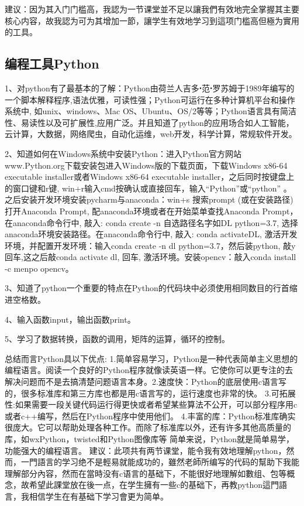 \documentclass[supercite]{Experimental_Report}
\theoremstyle{definition}
\begin{document}
	建议：因为其入门门槛高，我認为一节课堂並不足以讓我們有效地完全掌握其主要核心内容，故我認为可为其增加一節，讓学生有效地学习到這项门槛高但極为實用的工具。
	\newpage
	\subsection{编程工具Python}
	
	1、对python有了最基本的了解：Python由荷兰人吉多ꞏ范ꞏ罗苏姆于1989年编写的一个脚本解释程序,语法优雅，可读性强；Python可运行在多种计算机平台和操作系统中, 如unix、windows、Mac OS、Ubuntu、OS/2等等；Python语言具有简洁性、易读性以及可扩展性,应用广泛。并且知道了python的应用场合如人工智能，云计算，大数据，网络爬虫，自动化运维，web开发，科学计算，常规软件开发。
	
	2、知道如何在Windows系统中安装Python：进入Python官方网站www.Python.org下载安装包进入Windows版的下载页面，下载Windows x86-64 executable installer或者Windows x86-64 executable installer，之后同时按键盘上的窗口键和r键, win+r输入cmd按确认或直接回车，输入“Python”或“python” 。之后安装开发环境安装pycharm与anaconda：win+s 搜索prompt (或在安装路径) 打开Anaconda Prompt, 配anaconda环境或者在开始菜单查找Anaconda Prompt，在anaconda命令行中, 敲入: conda create -n 自选路径名字如DL python=3.7, 选择anaconda环境安装路径。在anaconda命令行中, 敲入: conda activateDL, 激活开发环境，并配置开发环境：输入conda create -n dl python=3.7，然后装python, 敲y回车,这之后敲conda activate dl, 回车, 激活环境。安装opencv：敲入conda install -c menpo opencv。
	
	3、知道了python一个重要的特点在Python的代码块中必须使用相同数目的行首缩进空格数。
	
	4、输入函数input，输出函数print。
	
	5、学习了数据转换，函数的调用，矩阵的运算，循环的控制。
	
	总结而言Python具以下优点:
	1.简单容易学习，Python是一种代表简单主义思想的编程语言。阅读一个良好的Python程序就像读英语一样。它使你可以更专注的去解决问题而不是去搞清楚问题语言本身。2.速度快：Python的底层使用c语言写的，很多标准库和第三方库也都是用c语言写的，运行速度也非常的快。
	3.可拓展性:如果需要一段关键代码运行得更快或者希望某些算法不公开，可以部分程序用c或者c++编写，然后在Python程序中使用他们。
	4.丰富的库：Python标准库确实很庞大。它可以帮助处理各种工作。而除了标准库以外，还有许多其他高质量的库，如wxPython，twisted和Python图像库等
	简单来说，Python就是简单易学，功能强大的编程语言。
	建议：此项共有两节课堂，能令我有效地理解python，然而，一門語言的学习绝不是輕易就能成功的，雖然老師所编写的代码的幫助下我能理解部分內容，然而在當時没有c语言的基础下，不能很好地理解如數组、包等概念，故希望此課堂放在後一点，在学生擁有一些c的基础下，再教python這門語言，我相信学生在有基础下学习會更为简单。
	\newpage
\end{document}
